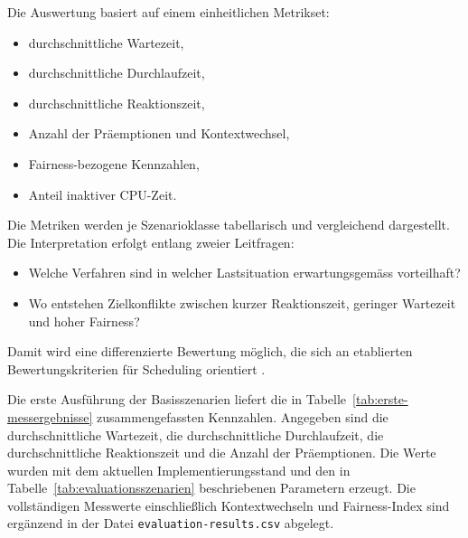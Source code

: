 Die Auswertung basiert auf einem einheitlichen Metrikset:

\begin{itemize}
    \item durchschnittliche Wartezeit,
    \item durchschnittliche Durchlaufzeit,
    \item durchschnittliche Reaktionszeit,
    \item Anzahl der Präemptionen und Kontextwechsel,
    \item Fairness-bezogene Kennzahlen,
    \item Anteil inaktiver CPU-Zeit.
\end{itemize}

Die Metriken werden je Szenarioklasse tabellarisch und vergleichend dargestellt. Die Interpretation erfolgt entlang zweier Leitfragen:

\begin{itemize}
    \item Welche Verfahren sind in welcher Lastsituation erwartungsgemäss vorteilhaft?
    \item Wo entstehen Zielkonflikte zwischen kurzer Reaktionszeit, geringer Wartezeit und hoher Fairness?
\end{itemize}

Damit wird eine differenzierte Bewertung möglich, die sich an etablierten Bewertungskriterien für Scheduling orientiert \cite{silberschatz2018operating,pinedo2016scheduling}.

Die erste Ausführung der Basisszenarien liefert die in Tabelle~\ref{tab:erste-messergebnisse} zusammengefassten Kennzahlen. Angegeben sind die durchschnittliche Wartezeit, die durchschnittliche Durchlaufzeit, die durchschnittliche Reaktionszeit und die Anzahl der Präemptionen. Die Werte wurden mit dem aktuellen Implementierungsstand und den in Tabelle~\ref{tab:evaluationsszenarien} beschriebenen Parametern erzeugt. Die vollständigen Messwerte einschließlich Kontextwechseln und Fairness-Index sind ergänzend in der Datei \texttt{evaluation-results.csv} abgelegt.

